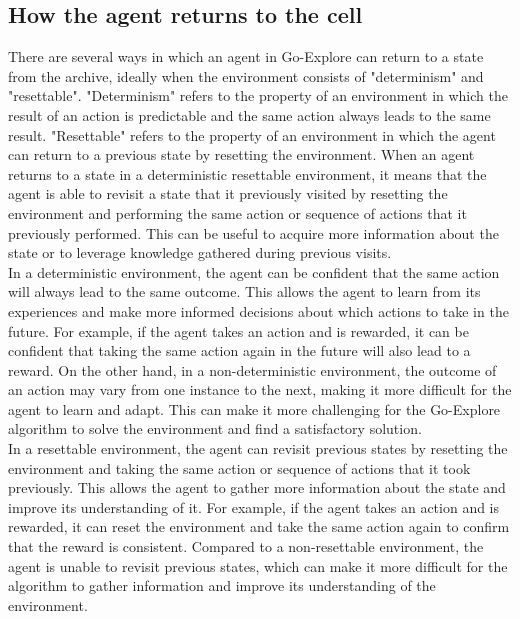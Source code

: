 \documentclass[runningheads]{llncs}%
\begin{document}
\subsection{How the agent returns to the cell}
There are several ways in which an agent in Go-Explore can return to a state from the archive, ideally when the environment consists of "determinism" and "resettable". "Determinism" refers to the property of an environment in which the result of an action is predictable and the same action always leads to the same result. "Resettable" refers to the property of an environment in which the agent can return to a previous state by resetting the environment. When an agent returns to a state in a deterministic resettable environment, it means that the agent is able to revisit a state that it previously visited by resetting the environment and performing the same action or sequence of actions that it previously performed. This can be useful to acquire more information about the state or to leverage knowledge gathered during previous visits.\\

In a deterministic environment, the agent can be confident that the same action will always lead to the same outcome. This allows the agent to learn from its experiences and make more informed decisions about which actions to take in the future. For example, if the agent takes an action and is rewarded, it can be confident that taking the same action again in the future will also lead to a reward. On the other hand, in a non-deterministic environment, the outcome of an action may vary from one instance to the next, making it more difficult for the agent to learn and adapt. This can make it more challenging for the Go-Explore algorithm to solve the environment and find a satisfactory solution.\\

In a resettable environment, the agent can revisit previous states by resetting the environment and taking the same action or sequence of actions that it took previously. This allows the agent to gather more information about the state and improve its understanding of it. For example, if the agent takes an action and is rewarded, it can reset the environment and take the same action again to confirm that the reward is consistent. Compared to a non-resettable environment, the agent is unable to revisit previous states, which can make it more difficult for the algorithm to gather information and improve its understanding of the environment.\\
\end{document}

